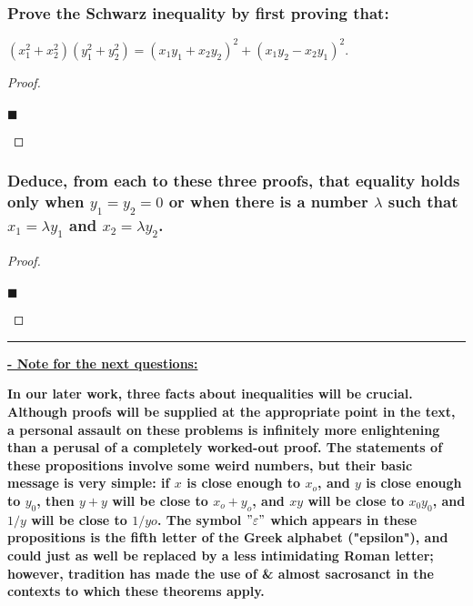 \documentclass[letterpaper, 10 pt, conference]{ieeeconf}  %
\begin{document}
\begin{mdframed}
\subsubsection{\textbf{Prove the Schwarz inequality by first proving that:}}
\begin{center}
    $(x_1^2 + x_2^2)(y_1^2 + y_2^2) = (x_1y_1 + x_2y_2)^2 + (x_1y_2 - x_2y_1)^2$.
\end{center}
\end{mdframed}

\begin{proof}
\begin{align}
    
\end{align}
\begin{flushright}
$\blacksquare$
\end{flushright}
\end{proof}

\begin{mdframed}
\subsubsection{\textbf{Deduce, from each to these three proofs, that equality holds only when $y_1 = y_2 = 0$ or when there is a number $\lambda$ such that $x_1 = \lambda y_1$ and $x_2 = \lambda y_2$.}}
\end{mdframed}

\begin{proof}
\begin{align}
    
\end{align}
\begin{flushright}
$\blacksquare$
\end{flushright}
\end{proof}
\noindent\rule{8cm}{0.4pt}
\newpage
\textbf{\underline{- Note for the next questions:}}
\begin{mdframed}
\textbf{In our later work, three facts about inequalities will be crucial. Although proofs will be supplied at the appropriate point in the text, a personal assault on these problems is infinitely more enlightening than a perusal of a completely worked-out proof. The statements of these propositions involve some weird numbers, but their basic message is very simple: if $x$ is close enough to $x_o$, and $y$ is close enough to $y_0$, then $y + y$ will be close to $x_o + y_o$, and $xy$ will be close to $x_0y_0$, and $1/y$ will be close to $1/yo$. The symbol $"\varepsilon"$ which appears in these propositions is the fifth letter of the Greek alphabet ("epsilon"), and could just as well be replaced by a less intimidating Roman letter; however, tradition has made the use of & almost sacrosanct in the contexts to which these theorems apply.}
\end{mdframed}
\end{document}
